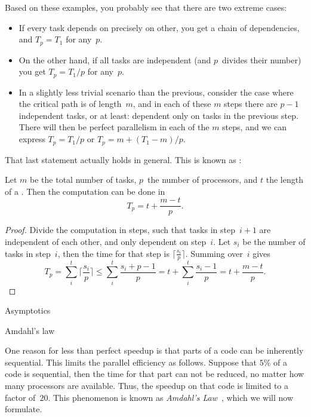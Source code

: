 Based on these examples, you probably see that there are two extreme cases:
\begin{itemize}
\item If every task depends on precisely on other, you get a chain
  of dependencies, and $T_p=T_1$ for any~$p$.
\item On the other hand, if all tasks are independent (and $p$~divides
  their number) you get $T_p=T_1/p$ for any~$p$.
\item In a slightly less trivial scenario than the previous,
  consider the case where
  the critical path is of length~$m$, and in each of these $m$ steps
  there are $p-1$ independent tasks, or at least: dependent only on
  tasks in the previous step. There will then be perfect parallelism
  in each of the $m$ steps, and we can express $T_p = T_1/p$
  or $T_p= m+ (T_1-m)/p$.
\end{itemize}

That last statement actually holds in general. This is known as
:
\begin{theorem}
  Let $m$ be the total number of tasks, $p$~the number of processors,
  and $t$ the length of a . Then
  the computation can be done in \[ T_p = t +\frac{m-t}{p}. \]
\end{theorem}
\begin{proof}
  Divide the computation in steps, such that tasks in step~$i+1$
  are independent of each other, and only dependent on step~$i$.
  Let $s_i$ be the number of tasks in step~$i$, then the time
  for that step is $\lceil \frac{s_i}{p} \rceil$.
  Summing over~$i$ gives
  \[ T_p = \sum_i^t \lceil \frac{s_i}{p} \rceil
  \leq \sum_i^t  \frac{s_i+p-1}{p}  = t + \sum_i^t  \frac{s_i-1}{p}  = t+\frac{m-t}{p}.
  \]
\end{proof}

 {Asymptotics}
\label{sec:asymptotics}


 {Amdahl's law}
\label{sec:amdahl}

One reason for less than perfect speedup is that parts of a code can
be inherently sequential. This limits the parallel efficiency as
follows. Suppose that $5\%$ of a code is sequential, then the time for
that part can not be reduced, no matter how many processors are
available. Thus, the speedup on that code is limited to a factor
of~$20$. This phenomenon is known as \emph{Amdahl's
  Law}~\cite{amd:law}, which we will now formulate.


